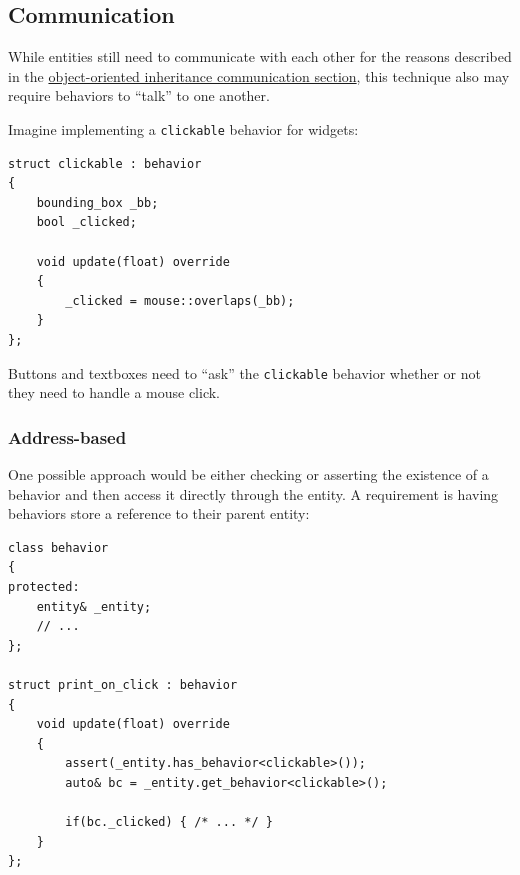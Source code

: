 \documentclass[twoside, 12pt, a4paper, openany]{book}
\begin{document}
\subsection{Communication}\label{communication}

While entities still need to communicate with each other for the reasons
described in the
\protect\hyperlink{chapter_oop_communication}{object-oriented
inheritance communication section}, this technique also may require
behaviors to ``talk'' to one another.

Imagine implementing a
\texttt{clickable}
behavior for widgets:

\begin{verbatim}
struct clickable : behavior
{
    bounding_box _bb;
    bool _clicked;

    void update(float) override
    {
        _clicked = mouse::overlaps(_bb);
    }
};
\end{verbatim}

Buttons and textboxes need to ``ask'' the
\texttt{clickable}
behavior whether or not they need to handle a mouse click.

\subsubsection{Address-based}\label{address-based-1}

One possible approach would be either checking or asserting the
existence of a behavior and then access it directly through the entity.
A requirement is having behaviors store a reference to their parent
entity:

\begin{verbatim}
class behavior
{
protected:
    entity& _entity;
    // ...
};

struct print_on_click : behavior
{
    void update(float) override
    {
        assert(_entity.has_behavior<clickable>());
        auto& bc = _entity.get_behavior<clickable>();

        if(bc._clicked) { /* ... */ }
    }
};
\end{verbatim}
\end{document}
